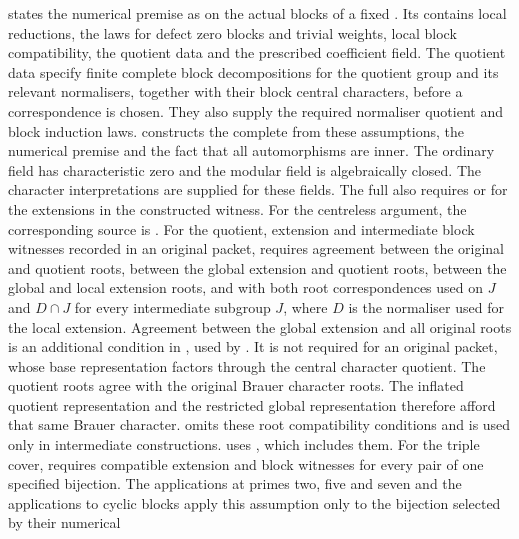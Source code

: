 \begin{implementation}
 states the
numerical premise as  on the actual
blocks of a fixed . Its 
contains local reductions, the laws for defect zero blocks and trivial weights,
local block compatibility, the quotient data and the prescribed
coefficient field. The quotient data specify finite complete block
decompositions for the quotient group and its relevant normalisers,
together with their block central characters, before a correspondence is
chosen. They also supply the required normaliser quotient and block
induction laws.
 constructs the complete 
from these assumptions, the numerical premise and the fact that
all automorphisms are inner. The ordinary field has characteristic zero and the modular field is
algebraically closed. The character interpretations are supplied for
these fields.
The full  also requires
 or
 for the extensions in the
constructed witness. For the centreless argument, the corresponding
source is . For the quotient, extension and intermediate block witnesses recorded in an original packet,
 requires agreement between the original and
quotient roots, between the global extension and quotient roots, between
the global and local extension roots, and with both root correspondences
used on $J$ and $D\cap J$ for every intermediate subgroup $J$, where $D$
is the normaliser used for the local extension.
Agreement between the global extension and all original roots is an
additional condition in , used by
. It is not required for an original packet,
whose base representation factors through the central character quotient.
The quotient roots agree with the original Brauer character roots. The
inflated quotient representation and the restricted global representation
therefore afford that same Brauer character.
 omits these root compatibility conditions
and is used only in intermediate constructions. 
uses , which includes them.
For the triple cover, 
requires compatible extension and block witnesses for every pair of one
specified bijection. The applications at primes two, five and seven and
the applications to cyclic blocks
apply this assumption only to the bijection selected by their numerical

\end{implementation}
